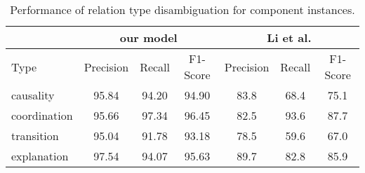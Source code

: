 \begin{table}[ht]
\centering
\begin{tabular}{|l|c|c|c|c|c|c|}
\hline

                        & \multicolumn{3}{c|}{our model}            & \multicolumn{3}{c|}{Li et al.}            \\ \hline
    Type                &     Precision &     Recall &     F1-Score &     Precision &     Recall &     F1-Score \\ \hline
    causality           &     95.84     &     94.20  &     94.90    &     83.8      &     68.4   &     75.1     \\ \hline
    coordination        &     95.66     &     97.34  &     96.45    &     82.5      &     93.6   &     87.7     \\ \hline
    transition          &     95.04     &     91.78  &     93.18    &     78.5      &     59.6   &     67.0     \\ \hline
    explanation         &     97.54     &     94.07  &     95.63    &     89.7      &     82.8   &     85.9     \\ \hline

\end{tabular}
\caption{\label{t:sense-word-types} Performance of relation type
disambiguation for component instances. }
\end{table}
